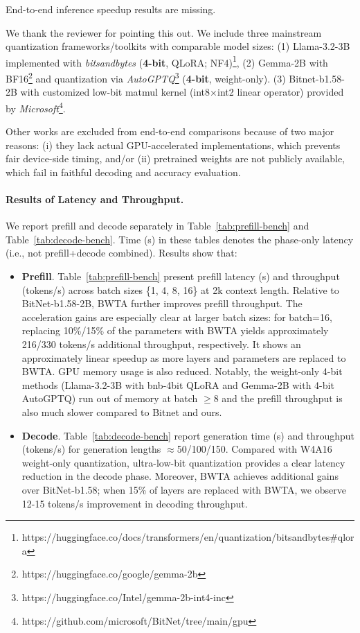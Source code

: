 \begin{revcomment}
End-to-end inference speedup results are missing.
\label{com:llm-e2e-speed}
\end{revcomment}
\begin{revresponse}[]
We thank the reviewer for pointing this out. 
We include three mainstream quantization frameworks/toolkits with comparable model sizes: (1) Llama-3.2-3B implemented with \textit{bitsandbytes} (\textbf{4-bit}, QLoRA; NF4)\footnote{https://huggingface.co/docs/transformers/en/quantization/bitsandbytes\#qlora}, (2) Gemma-2B with BF16\footnote{https://huggingface.co/google/gemma-2b} and quantization via \textit{AutoGPTQ}\footnote{https://huggingface.co/Intel/gemma-2b-int4-inc} (\textbf{4-bit}, weight-only). (3) Bitnet-b1.58-2B with customized low-bit matmul kernel (int8$\times$int2 linear operator) provided by \textit{Microsoft}\footnote{https://github.com/microsoft/BitNet/tree/main/gpu}. 

Other works are excluded from end-to-end comparisons because of two major reasons: (i) they lack actual GPU-accelerated implementations, which prevents fair device-side timing, and/or (ii) pretrained weights are not publicly available, which fail in faithful decoding and accuracy evaluation. 




\paragraph{Results of Latency and Throughput.} 
We report prefill and decode separately in Table~\ref{tab:prefill-bench} and Table~\ref{tab:decode-bench}. Time (s) in these tables denotes the phase-only latency (i.e., not prefill+decode combined). Results show that: 
\begin{itemize}
    \item \textbf{Prefill}. Table~\ref{tab:prefill-bench} present prefill latency (s) and throughput (tokens/s) across batch sizes \{1, 4, 8, 16\} at 2k context length. Relative to BitNet-b1.58-2B, BWTA further improves prefill throughput. The acceleration gains are especially clear at larger batch sizes: for batch=16, replacing 10\%/15\% of the parameters with BWTA yields approximately 216/330 tokens/s additional throughput, respectively. It shows an approximately linear speedup as more layers and parameters are replaced to BWTA. GPU memory usage is also reduced. Notably, the weight-only 4-bit methods (Llama-3.2-3B with bnb-4bit QLoRA and Gemma-2B with 4-bit AutoGPTQ) run out of memory at batch $\ge8$ and the prefill throughput is also much slower compared to Bitnet and ours. 
    \item \textbf{Decode}. Table~\ref{tab:decode-bench} report generation time (s) and throughput (tokens/s) for generation lengths $\approx$50/100/150. Compared with W4A16 weight-only quantization, ultra-low-bit quantization provides a clear latency reduction in the decode phase. Moreover, BWTA achieves additional gains over BitNet-b1.58; when 15\% of layers are replaced with BWTA, we observe 12-15 tokens/s improvement in decoding throughput. 
\end{itemize}


\end{revresponse}
